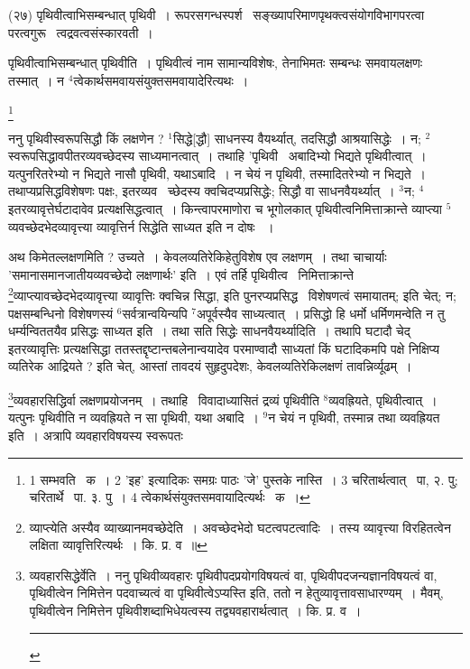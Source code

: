 \documentclass[11pt, openany]{book}
\newcommand\blfootnote[1]{%
 \begingroup
 \renewcommand\thefootnote{}\footnote{#1}%
 \addtocounter{footnote}{-1}%
 \endgroup
}
\begin{document}
\hangindent=2cm {\knu (२७) पृथिवीत्वाभिसम्बन्धात् पृथिवी~। रूपरसगन्धस्पर्श \textendash\ सङ्ख्यापरिमाणपृथक्त्वसंयोगविभागपरत्वा परत्वगुरू \textendash\ त्वद्रवत्वसंस्कारवती~।}

{\knu पृथिवीत्वाभिसम्बन्धात् पृथिवीति~।} पृथिवीत्वं नाम सामान्यविशेषः, तेनाभिमतः सम्बन्धः समवायलक्षणः तस्मात्~। न ${}^4$त्वेकार्थसमवायसंयुक्तसमवायादेरित्यथः~।

\blfootnote{1 सम्भवति \textendash\ क~। 2 'इह' इत्यादिकः समग्रः पाठः 'जे' पुस्तके नास्ति~। 3 चरितार्थत्वात्  \textendash\ पा, २. पु; चरितार्थे  \textendash\ पा. ३. पु~। 4 त्वेकार्थसंयुक्तसमवायादित्यर्थः  \textendash\ क~।}

\newpage
ननु पृथिवीस्वरूपसिद्धौ किं लक्षणेन ? ${}^1$सिद्धे[द्धौ] साधनस्य वैयर्थ्यात्, तदसिद्धौ आश्रयासिद्धेः~। न; ${}^2$स्वरूपसिद्धावपीतरव्यवच्छेदस्य साध्यमानत्वात्~। तथाहि 'पृथिवी \textendash\ अबादिभ्यो भिद्यते पृथिवीत्वात्~। यत्पुनरितरेभ्यो न भिद्यते नासौ पृथिवी, यथाऽबादि~। न चेयं न पृथिवी, तस्मादितरेभ्यो न भिद्यते~। तथाप्यप्रसिद्धविशेषणः पक्षः, इतरव्यव \textendash\ च्छेदस्य क्वचिदप्यप्रसिद्धेः; सिद्धौ वा साधनवैयर्थ्यात्~। ${}^3$न; ${}^4$इतरव्यावृत्तेर्घटादावेव प्रत्यक्षसिद्धत्वात्~। किन्त्वापरमाणोरा च भूगोलकात् पृथिवीत्वनिमित्ताक्रान्ते व्याप्त्या ${}^5$व्यवच्छेदभेदव्यावृत्त्या व्यावृत्तिर्न सिद्धेति साध्यत इति न दोषः ~।

अथ किमेतल्लक्षणमिति ? उच्यते~। केवलव्यतिरेकिहेतुविशेष एव लक्षणम्~। तथा चाचार्याः 'समानासमानजातीयव्यवच्छेदो लक्षणार्थः' इति~। एवं तर्हि पृथिवीत्व \textendash\ निमित्ताक्रान्ते \renewcommand{\thefootnote}{१}\footnote{व्याप्त्येति अस्यैव व्याख्यानमवच्छेदेति~। अवच्छेदभेदो घटत्वपटत्वादिः~। तस्य व्यावृत्त्या विरहितत्वेन लक्षिता व्यावृत्तिरित्यर्थः~। कि. प्र. व~॥}व्याप्त्यावच्छेदभेदव्यावृत्त्या व्यावृत्तिः क्वचिन्न सिद्धा, इति पुनरप्यप्रसिद्ध \textendash\ विशेषणत्वं समायातम्; इति चेत्; न; पक्षसम्बन्धिनो विशेषणस्यं ${}^6$सर्वत्रान्वयिन्यपि ${}^7$अपूर्वस्यैव साध्यत्वात्~। प्रसिद्धो हि धर्मो धर्मिणमन्वेति न तु धर्म्यन्विततयैव प्रसिद्धः साध्यत इति~। तथा सति सिद्धेः साधनवैयर्थ्यादिति~। तथापि घटादौ चेद् इतरव्यावृत्तिः प्रत्यक्षसिद्धा ततस्तद्दृष्टान्तबलेनान्वयादेव परमाण्वादौ साध्यतां किं घटादिकमपि पक्षे निक्षिप्य व्यतिरेक आद्रियते ? इति चेत्, आस्तां तावदयं सुहृदुपदेशः, केवलव्यतिरेकिलक्षणं तावन्निर्व्यूढम्~।

\renewcommand{\thefootnote}{२}\footnote{व्यवहारसिद्धेर्वेति~। ननु पृथिवीव्यवहारः पृथिवीपदप्रयोगविषयत्वं वा, पृथिवीपदजन्यज्ञानविषयत्वं वा, पृथिवीत्वेन निमित्तेन पदवाच्यत्वं वा पृथिवीत्वेऽप्यस्ति इति, ततो न हेतुव्यावृत्तावसाधारण्यम्~। मैवम्, पृथिवीत्वेन निमित्तेन पृथिवीशब्दाभिधेयत्वस्य तद्व्यवहारार्थत्वात्~। कि. प्र. व~।\\ \rule{0.4\linewidth}{0.5pt}}व्यवहारसिद्धिर्वा लक्षणप्रयोजनम्~। तथाहि \textendash\ विवादाध्यासितं द्रव्यं पृथिवीति ${}^8$व्यवह्रियते, पृथिवीत्वात्~। यत्पुनः पृथिवीति न व्यवह्रियते न सा पृथिवी, यथा अबादि~। ${}^9$न चेयं न पृथिवी, तस्मान्न तथा व्यवह्रियत इति~। अत्रापि व्यवहारविषयस्य स्वरूपतः
\end{document}
